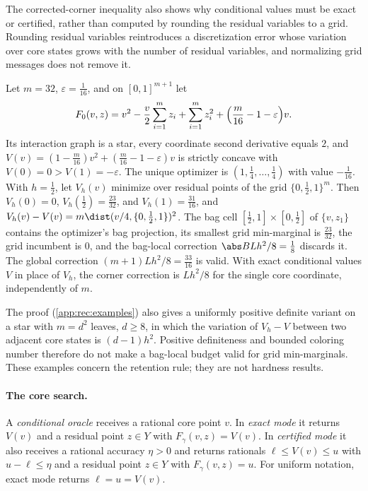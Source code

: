 The corrected-corner inequality also shows why conditional values must be
exact or certified, rather than computed by rounding the residual variables
to a grid. Rounding residual variables reintroduces a discretization error
whose variation over core states grows with the number of residual
variables, and normalizing grid messages does not remove it.

\begin{example}\label{ex:rec:star}
Let $m=32$, $\varepsilon=\frac1{16}$, and on $[0,1]^{m+1}$ let
\[
 F_0(v,z)=v^2-\frac v2\sum_{i=1}^mz_i+\sum_{i=1}^mz_i^2
 +\Bigl(\frac m{16}-1-\varepsilon\Bigr)v .
\]
Its interaction graph is a star, every coordinate second derivative equals
$2$, and $V(v)=(1-\frac m{16})v^2+(\frac m{16}-1-\varepsilon)v$ is strictly
concave with $V(0)=0>V(1)=-\varepsilon$. The unique optimizer is
$(1,\frac14,\ldots,\frac14)$ with value $-\frac1{16}$. With $h=\frac12$, let
$V_h(v)$ minimize over residual points of the grid $\{0,\frac12,1\}^m$. Then
$V_h(0)=0$, $V_h(\frac12)=\frac{23}{32}$, and $V_h(1)=\frac{31}{16}$, and
$V_h(v)-V(v)=m\dist(v/4,\{0,\frac12,1\})^2$. The bag cell
$[\frac12,1]\times[0,\frac12]$ of $\{v,z_1\}$ contains the optimizer's bag
projection, its smallest grid min-marginal is $\frac{23}{32}$, the grid
incumbent is $0$, and the bag-local correction $\abs BLh^2/8=\frac18$
discards it. The global correction $(m+1)Lh^2/8=\frac{33}{16}$ is valid. With
exact conditional values $V$ in place of $V_h$, the corner correction is
$Lh^2/8$ for the single core coordinate, independently of $m$.
\end{example}

The proof (\cref{app:rec:examples}) also gives a uniformly positive definite
variant on a star with $m=d^2$ leaves, $d\ge8$, in which the variation of
$V_h-V$ between two adjacent core states is $(d-1)h^2$. Positive
definiteness and bounded coloring number therefore do not make a bag-local
budget valid for grid min-marginals. These examples concern the retention
rule; they are not hardness results.

\paragraph{The core search.}
A \emph{conditional oracle} receives a rational core point $v$. In
\emph{exact mode} it returns $V(v)$ and a residual point $z\in Y$ with
$F_\gamma(v,z)=V(v)$. In \emph{certified mode} it also receives a rational
accuracy $\eta>0$ and returns rationals $\ell\le V(v)\le u$ with
$u-\ell\le\eta$ and a residual point $z\in Y$ with $F_\gamma(v,z)=u$. For
uniform notation, exact mode returns $\ell=u=V(v)$.

